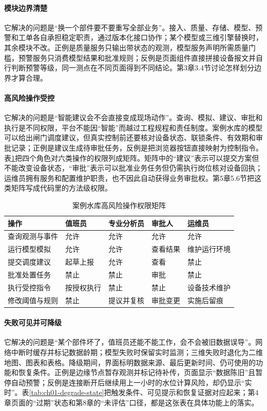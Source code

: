 \paragraph{模块边界清楚}
它解决的问题是“换一个部件要不要重写全部业务”。接入、质量、存储、模型、预警和工单各自承担稳定职责，通过版本化接口协作；某个模型或三维引擎替换时，其余模块不改。正例是质量服务只输出带状态的观测，模型服务声明所需质量门槛，预警服务只消费模型结果和批准规则；反例是页面组件直接拼接设备报文并自行判断预警等级，同一测点在不同页面得到不同结论。第3章3.4节讨论怎样划分边界才算合理。

\paragraph{高风险操作受控}
它解决的问题是“智能建议会不会直接变成现场动作”。查询、模拟、建议、审批和执行是不同权限，平台不能因“智能”而越过工程规程和责任制度。案例水库的模型可以给出闸门调度建议，但真实控制前还要核对设备状态、联锁条件、有效期和审批记录；正例是建议生成待审批任务，反例是把浏览器按钮直接映射为控制指令。表\ref{tab:ch01-risk-permission}把四个角色对六类操作的权限列成矩阵。矩阵中的“建议”表示可以提交方案但不能改变设备状态，“审批”表示可以批准业务任务但仍需执行岗位核对设备回执；运维员拥有服务和配置维护职责，也不因此自动获得业务审批权。第5章5.6节把这类矩阵写成代码里的方法级权限。

\begin{table}[htbp]
\centering
\caption{案例水库高风险操作权限矩阵}
\label{tab:ch01-risk-permission}
\begin{tabular}{p{3.0cm}p{2.6cm}p{2.6cm}p{2.6cm}p{2.6cm}}
\toprule
操作 & 值班员 & 专业分析员 & 审批人 & 运维员 \\
\midrule
查询观测与事件 & 允许 & 允许 & 允许 & 允许 \\
运行模型模拟 & 允许 & 允许 & 查看结果 & 维护运行环境 \\
提交调度建议 & 起草上报 & 允许 & 查看 & 禁止 \\
批准处置任务 & 禁止 & 禁止 & 审批 & 禁止 \\
执行受控指令 & 按授权执行 & 禁止 & 禁止 & 设备技术维护 \\
修改阈值与规则 & 禁止 & 提议并复核 & 审批变更 & 实施后留痕 \\
\bottomrule
\end{tabular}
\end{table}

\paragraph{失败可见并可降级}
它解决的问题是“某个部件坏了，值班员还能不能工作，会不会被旧数据误导”。网络中断时缓存并标记数据龄期；模型失败时保留实时监测；三维失败时退化为二维地图、图表和表格。降级期间，界面标明数据来源、最后更新时间、仍可使用的功能和恢复条件。正例是边缘节点暂存观测并标记待补传，页面显示“数据陈旧”且暂停自动预警；反例是连接断开后继续用上一小时的水位计算风险，却仍显示“实时”。表\ref{tab:ch01-degrade-state}把触发条件、可见提示和恢复证据对应起来；第4章页面的“过期”状态和第8章的“未评估”口径，都是这张表在具体功能上的落实。

